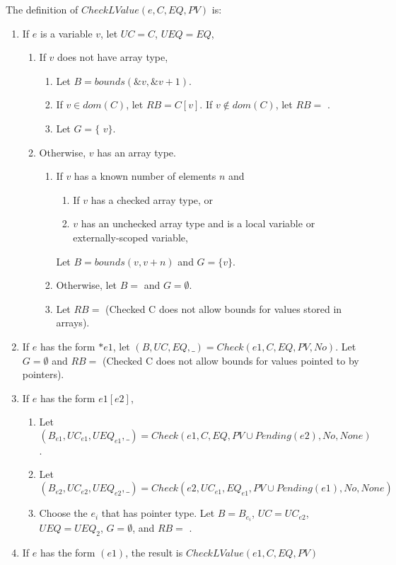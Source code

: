 The definition of $CheckLValue(e, C, EQ, PV)$ is:
\begin{enumerate}
\item If $e$ is a variable $v$, let $\mathit{UC} = C$, $UEQ=EQ$,
\begin{enumerate}
\item If $v$ does not have array type,
\begin{enumerate}
\item Let $B = bounds(\&v,\&v + 1)$.
\item If $v \in dom(C)$, let $RB = C[v]$.  If $v \notin dom(C)$, let $RB =$ \boundsunknown.
\item Let $G=\{$ \code{&}$v \}$.
\end{enumerate}
\item Otherwise, $v$ has an array type.
\begin{enumerate}
\item If $v$ has a known number of elements $n$ and
\begin{enumerate}
\item If $v$ has a checked array type, or
\item $v$ has an unchecked array type and is a local variable or externally-scoped variable,
\end{enumerate}
Let $B = bounds(v, v + n)$ and $G =\{ v \}$.
\item Otherwise, let $B = $ \boundsunknown and $G = \emptyset$.
\item Let $RB = $ \boundsunknown (Checked C does not allow bounds for values stored in arrays).
\end{enumerate}
\end{enumerate}
\item If $e$ has the form $*e1$,  let $(B, \mathit{UC}, EQ, \_) = Check(e1, C, EQ, PV, No)$.  Let $G =\emptyset$ and $RB = $ \boundsunknown (Checked C does not allow bounds for values pointed to by pointers).
\item If $e$ has the form $e1[e2]$,
\label{list:check-unordered-subscript-operands}
\begin{enumerate}
\item Let $(B_{e1}, \mathit{UC}_{e1}, {UEQ}_{e1}, \_) = Check(e1, C, EQ, PV \cup Pending(e2), No, 
         None)$.
\item Let $(B_{e2}, \mathit{UC}_{e2}, {UEQ}_{e2}, \_) = Check(e2, \mathit{UC}_{e1}, {EQ}_{e1},
         PV \cup Pending(e1), No, None)$
\item Choose the $e_i$ that has pointer type.   Let $B = B_{e_i}$, $\mathit{UC} = \mathit{UC}_{e2}$, 
$UEQ  = {UEQ}_2$,  $G=\emptyset$, and $RB = $ \boundsunknown.
\end{enumerate}
\item If $e$ has the form $(e1)$, the result is $CheckLValue(e1, C, EQ, PV)$
\end{enumerate}

